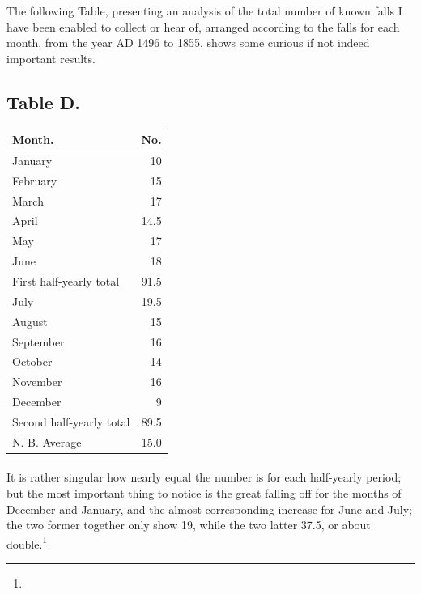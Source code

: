 \documentclass[a4paper, 12pt, oneside]{article}
\begin{document}
The following Table, presenting an analysis of the total number of known falls I have been enabled to collect or hear of, arranged according to the falls for each month, from the year AD 1496 to 1855, shows some curious if not indeed important results.
\subsection{Table D.}
 \begin{table}[H]
    \centering
    \bfseries
    \Fontauri
    \begin{tabular}{|l|r|}
    \hline
        Month. & No. \\ \hline
        January & 10 \\
        February & 15 \\
        March & 17 \\
        April & 14.5 \\
        May & 17 \\
        June & 18 \\ \hline
        First half-yearly total & 91.5 \\ \hline
        July & 19.5 \\
        August & 15 \\
        September & 16 \\
        October & 14 \\
        November & 16 \\
        December & 9 \\ \hline
        Second half-yearly total & 89.5 \\ \hline \hline
        N. B. Average & 15.0 \\ \hline
    \end{tabular}
\end{table}
\paragraph{}
It is rather singular how nearly equal the number is for each half-yearly period; but the most important thing to notice is the great falling off for the months of December and January, and the almost corresponding increase for June and July; the two former together only show 19, while the two latter 37.5, or about double.\footnote{}
\end{document}
